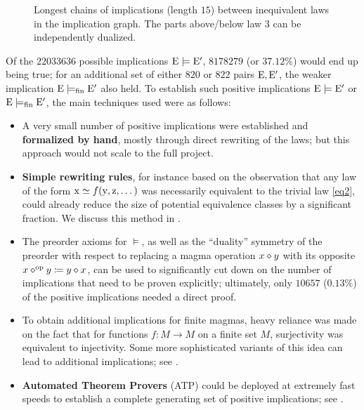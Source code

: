 \begin{figure}
{%
    }
    \caption{Longest chains of implications (length $15$) between inequivalent laws in the implication graph.  The parts above/below law 3 can be independently dualized. }
    \label{fig:longchain}
\end{figure}

Of the $\num{22033636}$ possible implications ${\mathrm{E}} \models {\mathrm{E}'}$, $\num{8178279}$ (or $37.12\%$) would end up being true; for an additional set of either $820$ or $822$ pairs $\mathrm{E},{\mathrm{E}'}$, the weaker implication ${\mathrm{E}} \models_{\mathrm{fin}} {\mathrm{E}'}$ also held. To establish such positive implications ${\mathrm{E}} \models {\mathrm{E}'}$ or ${\mathrm{E}} \models_{\mathrm{fin}} {\mathrm{E}'}$, the main techniques used were as follows:

\begin{itemize}
    \item A very small number of positive implications were established and \textbf{formalized by hand}, mostly through direct rewriting of the laws; but this approach would not scale to the full project.
    \item \textbf{Simple rewriting rules}, for instance based on the observation that any law of the form $\mathrm{x} \simeq f(\mathrm{y},\mathrm{z},\dots)$ was necessarily equivalent to the trivial law \eqref{eq2}, could already reduce the size of potential equivalence classes by a significant fraction. We discuss this method in .
    \item The preorder axioms for $\models$, as well as the ``duality'' symmetry of the preorder with respect to replacing a magma operation $x \diamond y$ with its opposite $x \diamond^{\mathrm{op}} y \coloneqq y \diamond x$, can be used to significantly cut down on the number of implications that need to be proven explicitly; ultimately, only $10657$ ($0.13\%$) of the positive implications needed a direct proof.
    \item To obtain additional implications for finite magmas, heavy reliance was made on the fact that for functions $f \colon M \to M$ on a finite set $M$, surjectivity was equivalent to injectivity.  Some more sophisticated variants of this idea can lead to additional implications; see .
    \item \textbf{Automated Theorem Provers} (ATP) could be deployed at extremely fast speeds to establish a complete generating set of positive implications; see .
\end{itemize}

